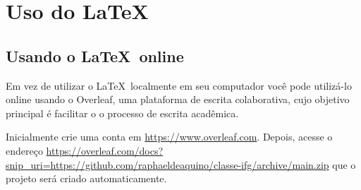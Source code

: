 \chapter{Uso do \LaTeX}


\section{Usando o \LaTeX\ online}

Em vez de utilizar o \LaTeX\ localmente em seu computador você pode utilizá-lo online usando o Overleaf, uma plataforma de escrita colaborativa, cujo objetivo principal  é facilitar o o processo de escrita acadêmica.

Inicialmente crie uma conta em \url{https://www.overleaf.com}. Depois, acesse o endereço \url{https://overleaf.com/docs?snip_uri=https://github.com/raphaeldeaquino/classe-ifg/archive/main.zip} que o projeto será criado automaticamente.